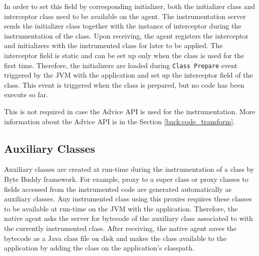 In order to set this field by corresponding initializer, both the initializer class and interceptor class need to be available on the agent. The instrumentation server sends the initializer class together with the instance of interceptor during the instrumentation of the class. Upon receiving, the agent registers the interceptor and initializers with the instrumented class for later to be applied. The interceptor field is static and can be set up only when the class is used for the first time. Therefore, the initializers are loaded during \texttt{Class Prepare} event triggered by the JVM with the application and set up the interceptor field of the class. This event is triggered when the class is prepared, but no code has been execute so far. 

This is not required in case the Advice API is used for the instrumentation. More information about the Advice API is in the Section \ref{back:code_transform}.

\subsection{Auxiliary Classes}
Auxiliary classes are created at run-time during the instrumentation of a class by Byte Buddy framework. For example, proxy to a super class or proxy classes to fields accessed from the instrumented code are generated automatically as auxiliary classes. Any instrumented class using this proxies requires these classes to be available at run-time on the JVM with the application. Therefore, the native agent asks the server for bytecode of the auxiliary class associated to with the currently instrumented class. After receiving, the native agent saves the bytecode as a Java class file on disk and makes the class available to the application by adding the class on the application's classpath.

